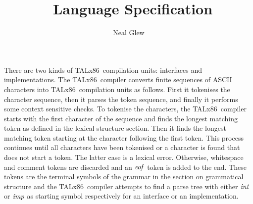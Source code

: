 \documentclass{article}
\title{\tal\ Language Specification}
\author{Neal Glew}
\newcommand{\tal}{{\sf TALx86}}
\newcommand{\nterm}[1]{{\it#1}}
\newcommand{\term}[1]{{\it#1}}
\begin{document}
\maketitle
There are two kinds of \tal\ compilation units: interfaces and
implementations.  The \tal\ compiler converts finite sequences of ASCII
characters into \tal\ compilation units as follows.  First it tokenises the
character sequence, then it parses the token sequence, and finally it performs
some context sensitive checks.  To tokenise the characters, the \tal\ compiler
starts with the first character of the sequence and finds the longest matching
token as defined in the lexical structure section.  Then it finds the longest
matching token starting at the character following the first token.  This
process continues until all characters have been tokenised or a character is
found that does not start a token.  The latter case is a lexical error.
Otherwise, whitespace and comment tokens are discarded and an $\term{eof}$
token is added to the end.  These tokens are the terminal symbols of the
grammar in the section on grammatical structure and the \tal\ compiler attempts
to find a parse tree with either $\nterm{int}$ or $\nterm{imp}$ as starting
symbol respectively for an interface or an implementation.
\end{document}
